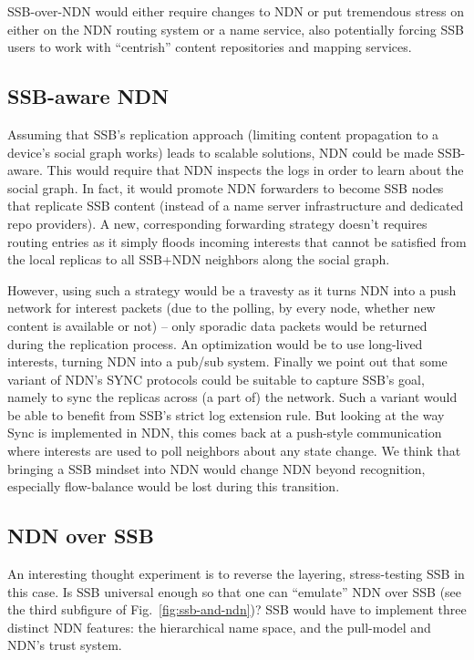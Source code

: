 \documentclass[10pt,sigconf]{acmart}
\begin{document}
SSB-over-NDN would either require changes to NDN or put tremendous
stress on either on the NDN routing system or a name service, also
potentially forcing SSB users to work with ``centrish'' content
repositories and mapping services.

\subsection{SSB-aware NDN}

Assuming that SSB's replication approach (limiting content propagation
to a device's social graph works) leads to scalable solutions, NDN
could be made SSB-aware. This would require that NDN inspects the logs
in order to learn about the social graph. In fact, it would promote
NDN forwarders to become SSB nodes that replicate SSB content (instead
of a name server infrastructure and dedicated repo providers). A new,
corresponding forwarding strategy doesn't requires routing entries as
it simply floods incoming interests that cannot be satisfied from the
local replicas to all SSB+NDN neighbors along the social graph.

However, using such a strategy would be a travesty as it turns NDN
into a push network for interest packets (due to the polling, by every
node, whether new content is available or not) -- only sporadic data
packets would be returned during the replication process. An
optimization would be to use long-lived interests, turning NDN into a
pub/sub system. Finally we point out that some variant of NDN's SYNC
protocols could be suitable to capture SSB's goal, namely to sync the
replicas across (a part of) the network. Such a variant would be able
to benefit from SSB's strict log extension rule. But looking at the
way Sync is implemented in NDN, this comes back at a push-style
communication where interests are used to poll neighbors about any
state change. We think that bringing a SSB mindset into NDN would
change NDN beyond recognition, especially flow-balance would be
lost during this transition.

\subsection{NDN over SSB}
\label{ssect:ndn-over-ssb}

An interesting thought experiment is to reverse the layering,
stress-testing SSB in this case. Is SSB universal enough so that one
can ``emulate'' NDN over SSB (see the third subfigure of
Fig.~\ref{fig:ssb-and-ndn})? SSB would have to implement three
distinct NDN features: the hierarchical name space, and the pull-model
and NDN's trust system.
\end{document}
